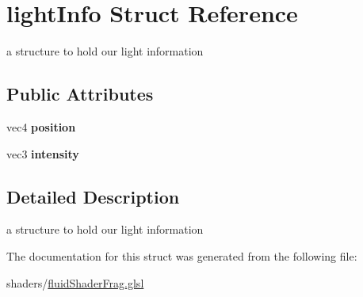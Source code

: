\hypertarget{structlight_info}{\section{light\-Info Struct Reference}
\label{structlight_info}
}


a structure to hold our light information  


\subsection*{Public Attributes}
\begin{DoxyCompactItemize}
\item 
\hypertarget{structlight_info_a91464db499bb017224ed4137db3ad357}{vec4 {\bfseries position}}\label{structlight_info_a91464db499bb017224ed4137db3ad357}

\item 
\hypertarget{structlight_info_a0a3a282dd8998aed665222fd1902611f}{vec3 {\bfseries intensity}}\label{structlight_info_a0a3a282dd8998aed665222fd1902611f}

\end{DoxyCompactItemize}


\subsection{Detailed Description}
a structure to hold our light information 

The documentation for this struct was generated from the following file\-:\begin{DoxyCompactItemize}
\item 
shaders/\hyperlink{fluid_shader_frag_8glsl}{fluid\-Shader\-Frag.\-glsl}\end{DoxyCompactItemize}
